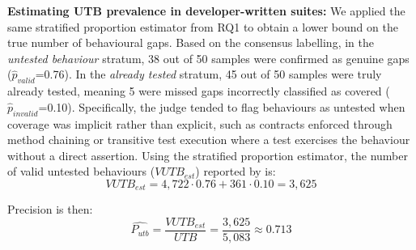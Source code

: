 \smallskip
\noindent\textbf{Estimating UTB prevalence in developer-written suites:}
%
We applied the same stratified proportion estimator from RQ1 to obtain a lower bound on the true number of behavioural gaps. Based on the consensus labelling, in 
the \textit{untested behaviour} stratum, 38 out of 50 samples were confirmed as genuine gaps ($\hat{p}_{valid}$=0.76). In the \textit{already tested} stratum, 45 out of 50 samples were truly already tested, meaning 5 were missed gaps incorrectly classified as covered ($\hat{p}_{invalid}$=0.10).
Specifically, the judge tended to flag behaviours as untested when coverage was implicit rather than explicit, such as contracts enforced through method chaining or transitive test execution where a test exercises the behaviour without a direct assertion.
Using the stratified proportion estimator, the number of valid untested behaviours ($VUTB_{est}$) reported by \toolname{} is:
\[
VUTB_{est} =  4,\!722 \cdot 0.76 + 361 \cdot 0.10 = 3,\!625
\]

Precision is then: 
\[
\hat{P_{utb}} = \frac{VUTB_{est}}{UTB} = \frac{3,\!625}{5,\!083} \approx 0.713
\]



